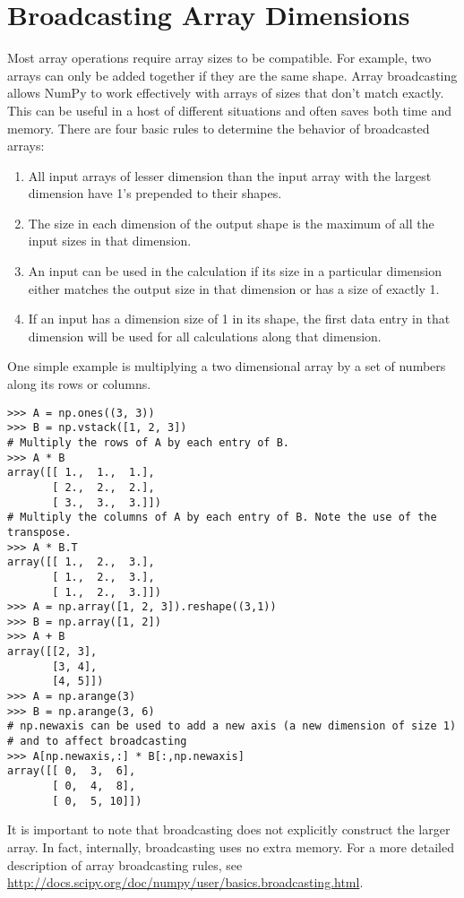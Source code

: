 \section*{Broadcasting Array Dimensions}
Most array operations require array sizes to be compatible.
For example, two arrays can only be added together if they are the same shape.
Array broadcasting allows NumPy to work effectively with arrays of sizes 
that don't match exactly. This can be useful in a host of different 
situations and often saves both time and memory. There are four basic rules 
to determine the behavior of broadcasted arrays:
\begin{enumerate}
\item All input arrays of lesser dimension than the input array with the
largest dimension have 1's prepended to their shapes.
\item The size in each dimension of the output shape is the maximum of all 
the input sizes in that dimension.
\item An input can be used in the calculation if its size in a particular 
dimension either matches the output size in that dimension or has a size 
of exactly 1.
\item If an input has a dimension size of 1 in its shape, the first data 
entry in that dimension will be used for all calculations along that 
dimension.
\end{enumerate}

One simple example is multiplying a two dimensional array by a set of numbers 
along its rows or columns. 

\begin{lstlisting}
>>> A = np.ones((3, 3))
>>> B = np.vstack([1, 2, 3])
# Multiply the rows of A by each entry of B.
>>> A * B
array([[ 1.,  1.,  1.],
       [ 2.,  2.,  2.],
       [ 3.,  3.,  3.]])
# Multiply the columns of A by each entry of B. Note the use of the transpose.
>>> A * B.T 
array([[ 1.,  2.,  3.],
       [ 1.,  2.,  3.],
       [ 1.,  2.,  3.]])
>>> A = np.array([1, 2, 3]).reshape((3,1))
>>> B = np.array([1, 2])
>>> A + B
array([[2, 3],
       [3, 4],
       [4, 5]])
>>> A = np.arange(3)
>>> B = np.arange(3, 6)
# np.newaxis can be used to add a new axis (a new dimension of size 1) 
# and to affect broadcasting
>>> A[np.newaxis,:] * B[:,np.newaxis] 
array([[ 0,  3,  6],
       [ 0,  4,  8],
       [ 0,  5, 10]])
\end{lstlisting}

It is important to note that broadcasting does not explicitly construct the 
larger array. In fact, internally, broadcasting uses no extra memory.
For a more detailed description of array broadcasting rules, see 
\url{http://docs.scipy.org/doc/numpy/user/basics.broadcasting.html}.

